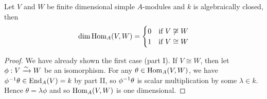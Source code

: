 \begin{thm}
	Let $V$ and $W$ be finite dimensional simple $A$-modules and $k$ is algebraically closed, then
	\[
		\dim \operatorname{Hom}_A(V,W)=
		\begin{cases}
			0 & \text{if } V \not\cong W \\
			1 & \text{if } V \cong W
		\end{cases}
	\]
\end{thm}

\begin{proof}
	We have already shown the first case (part I).
	If $V \cong W$, then let $\phi: V \xrightarrow{\sim} W$ be an isomorphism.
	For any $\theta \in \operatorname{Hom}_A(V,W)$, we have $\phi^{-1}\theta \in \operatorname{End}_A(V) = k$ by part II, so $\phi^{-1}\theta$ is scalar multiplication by some $\lambda \in k$.
	Hence $\theta=\lambda\phi$ and so $\operatorname{Hom}_A(V,W)$ is one dimensional.
\end{proof}

